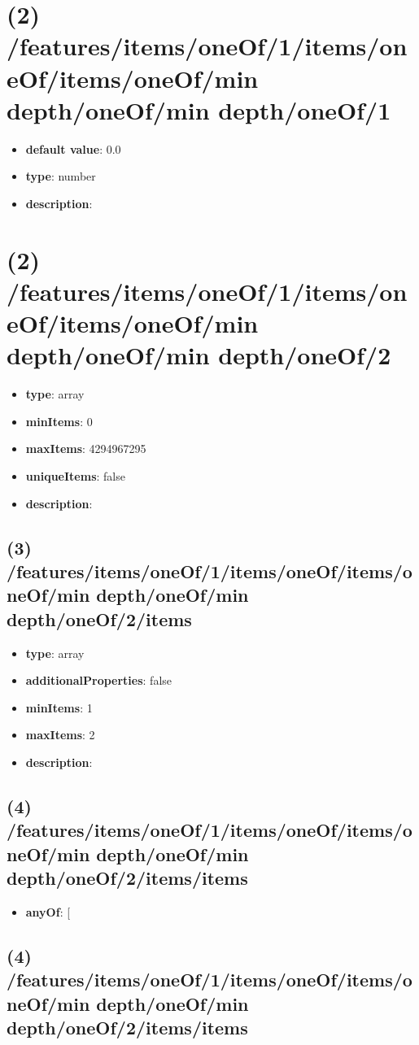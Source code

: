 \section{(2) /features/items/oneOf/1/items/oneOf/items/oneOf/min depth/oneOf/min depth/oneOf/1}
\begin{itemize}[leftmargin=2em]\item {\bf default value}: 0.0
\item {\bf type}: number
\item {\bf description}: 
\end{itemize}\section{(2) /features/items/oneOf/1/items/oneOf/items/oneOf/min depth/oneOf/min depth/oneOf/2}
\begin{itemize}[leftmargin=2em]\item {\bf type}: array
\item {\bf minItems}: 0
\item {\bf maxItems}: 4294967295
\item {\bf uniqueItems}: false
\item {\bf description}: 
\end{itemize}\subsection{(3) /features/items/oneOf/1/items/oneOf/items/oneOf/min depth/oneOf/min depth/oneOf/2/items}
\begin{itemize}[leftmargin=3em]\item {\bf type}: array
\item {\bf additionalProperties}: false
\item {\bf minItems}: 1
\item {\bf maxItems}: 2
\item {\bf description}: 
\end{itemize}\subsection{(4) /features/items/oneOf/1/items/oneOf/items/oneOf/min depth/oneOf/min depth/oneOf/2/items/items}
\begin{itemize}[leftmargin=4em]\item {\bf anyOf}: [\end{itemize}\subsection{(4) /features/items/oneOf/1/items/oneOf/items/oneOf/min depth/oneOf/min depth/oneOf/2/items/items}
